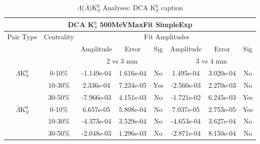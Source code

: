 \documentclass[../AnalysisNoteJBuxton.tex]{subfiles}
\begin{document}
\begin{table}
 \centering
 \begin{tabular}{|c|c|c|c|c||c|c|c|}
  \multicolumn{8}{c}{DCA K$^{0}_{S}$ 500MeVMaxFit SimpleExp} \\
  \hline
  \multirow{3}{*}{Pair Type} & \multirow{3}{*}{Centrality} & \multicolumn{6}{c|}{Fit Amplitudes} \\
  \cline{3-8}
   & & Amplitude & Error & Sig & Amplitude & Error & Sig \\  
  \cline{3-8}
   & & \multicolumn{3}{c||}{2 vs 3 mm} & \multicolumn{3}{c|}{3 vs 4 mm} \\  
  \hline  
  \multirow{3}{*}{$\Lambda$K$^{0}_{S}$}  
   &  0-10\% & -1.149e-04 & 1.616e-04 & No & 1.495e-04 & 3.020e-04 & No \\
   & 10-30\% & 2.336e-04 & 7.234e-05 & Yes & -2.560e-03 & 2.270e-03 & No \\
   & 30-50\% & -7.966e-03 & 4.151e-03 & No & -1.721e-02 & 6.245e-03 & Yes \\
  \hline  
  \multirow{3}{*}{$\bar{\Lambda}$K$^{0}_{S}$}  
   &  0-10\% & 6.657e-05 & 5.808e-04 & No & 7.037e-05 & 2.753e-05 & Yes \\
   & 10-30\% & -4.373e-04 & 3.529e-04 & No & -4.653e-04 & 3.627e-04 & No \\
   & 30-50\% & -2.048e-03 & 1.296e-03 & No & -2.871e-04 & 8.150e-04 & No \\
  \hline
 \end{tabular}
 \caption{$\Lambda$($\bar{\Lambda}$)K$^{0}_{S}$ Analyses: DCA K$^{0}_{S}$ caption}
 \label{tab:K0DcaLamK0_500MeVMaxFit_SimpleExp}
\end{table}




\end{document}
